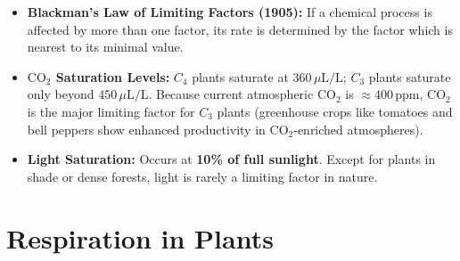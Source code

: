 \documentclass[10pt,a4paper]{article}
\begin{document}
\begin{trapbox}
\begin{itemize}
  \item \textbf{Blackman's Law of Limiting Factors (1905):} If a chemical process is affected by more than one factor, its rate is determined by the factor which is nearest to its minimal value.
  \item \textbf{$\mathrm{CO}_2$ Saturation Levels:} $C_4$ plants saturate at \textbf{$360\,\mu\mathrm{L/L}$}; $C_3$ plants saturate only beyond \textbf{$450\,\mu\mathrm{L/L}$}. Because current atmospheric $\mathrm{CO}_2$ is $\approx 400\,\mathrm{ppm}$, $\mathrm{CO}_2$ is the major limiting factor for $C_3$ plants (greenhouse crops like tomatoes and bell peppers show enhanced productivity in $\mathrm{CO}_2$-enriched atmospheres).
  \item \textbf{Light Saturation:} Occurs at \textbf{10\% of full sunlight}. Except for plants in shade or dense forests, light is rarely a limiting factor in nature.
\end{itemize}
\end{trapbox}

\section{Respiration in Plants}
\end{document}

